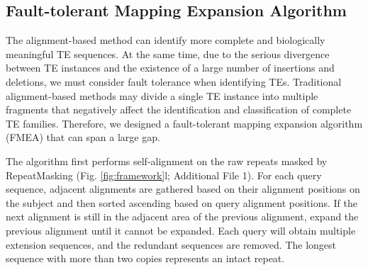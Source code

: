 \documentclass{bmcart}
\begin{document}
%		
%		
%		
%		
%		

\subsection*{Fault-tolerant Mapping Expansion Algorithm}
The alignment-based method can identify more complete and biologically meaningful TE sequences. At the same time, due to the serious divergence between TE instances and the existence of a large number of insertions and deletions, we must consider fault tolerance when identifying TEs. Traditional alignment-based methods may divide a single TE instance into multiple fragments that negatively affect the identification and classification of complete TE families. Therefore, we designed a fault-tolerant mapping expansion algorithm (FMEA) that can span a large gap.

The algorithm first performs self-alignment on the raw repeats masked by RepeatMasking (Fig. \ref{fig:framework}l; Additional File 1). For each query sequence, adjacent alignments are gathered based on their alignment positions on the subject and then sorted ascending based on query alignment positions. If the next alignment is still in the adjacent area of the previous alignment, expand the previous alignment until it cannot be expanded. Each query will obtain multiple extension sequences, and the redundant sequences are removed. The longest sequence with more than two copies represents an intact repeat.

\end{document}
